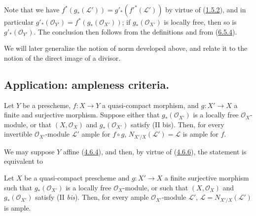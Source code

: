 Note that we have $f^*(g_*(\mathcal{L}'))=g'_*({f'}^*(\mathcal{L}'))$ by
virtue of (\hyperref[II.1.5.2]{1.5.2}), and in particular
$g'_*(\mathcal{O}_{Y'})=f^*(g_*(\mathcal{O}_{X'}))$; if
$g_*(\mathcal{O}_{X'})$ is locally free, then so is
$g'_*(\mathcal{O}_{Y'})$. The conclusion then follows from the definitions
and from (\hyperref[II.6.5.4]{6.5.4}).

\begin{remark}[6.5.9]
\label{II.6.5.9}
We will later generalize the notion of norm developed above, and relate it
to the notion of the direct image of a divisor.
\end{remark}

\subsection{Application: ampleness criteria.}
\label{subsection:II.6.6}

\begin{proposition}[6.6.1]
\label{II.6.6.1}
Let $Y$ be a prescheme, $f:X\to Y$ a quasi-compact morphism, and
$g:X'\to X$ a finite and surjective morphism. Suppose either that
$g_*(\mathcal{O}_{X'})$ is a locally free $\mathcal{O}_X$-module, or
that $(X,\mathcal{O}_X)$ and $g_*(\mathcal{O}_{X'})$ satisfy \textup{(II bis)}. Then, for every invertible $\mathcal{O}_{X'}$-module
$\mathcal{L}'$ ample for $f\circ g$, $N_{X'/X}(\mathcal{L}')=\mathcal{L}$
is ample for $f$.
\end{proposition}

We may suppose $Y$ affine (\hyperref[II.4.6.4]{4.6.4}), and then, by
virtue of (\hyperref[II.4.6.6]{4.6.6}), the statement is equivalent to

\begin{corollary}[6.6.2]
\label{II.6.6.2}
Let $X$ be a quasi-compact prescheme and $g:X'\to X$ a finite surjective
morphism such that $g_*(\mathcal{O}_{X'})$ is a locally free
$\mathcal{O}_X$-module, or such that $(X,\mathcal{O}_X)$ and
$g_*(\mathcal{O}_{X'})$ satisfy (II \emph{bis}). Then, for every ample
$\mathcal{O}_{X'}$-module $\mathcal{L}'$,
$\mathcal{L}=N_{X'/X}(\mathcal{L}')$ is ample.
\end{corollary}

